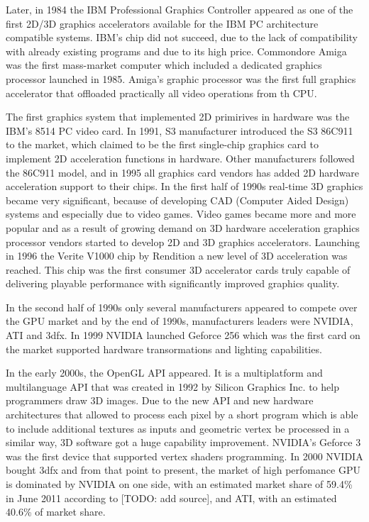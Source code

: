\documentclass[thesis=M,english]{FITthesis}[2011/07/15]
\begin{document}
Later, in 1984 the IBM Professional Graphics Controller appeared as one of the first 2D/3D graphics accelerators available for the IBM PC architecture compatible systems. IBM’s chip did not succeed, due to the lack of compatibility with already existing programs and due to its high price. Commondore Amiga was the first mass-market computer which included a dedicated graphics processor launched in 1985. Amiga's graphic processor was the first full graphics accelerator that offloaded practically all video operations from th CPU.

The first graphics system that implemented 2D primirives in hardware was the IBM's 8514 PC video card. In 1991, S3 manufacturer introduced the S3 86C911 to the market, which claimed to be the first single-chip graphics card to implement 2D acceleration functions in hardware. Other manufacturers followed the 86C911 model, and in 1995 all graphics card vendors has added 2D hardware acceleration support to their chips. In the first half of 1990s real-time 3D graphics became very significant, because of developing CAD (Computer Aided Design) systems and especially due to video games. Video games became more and more popular and as a result of growing demand on 3D hardware acceleration graphics processor vendors started to develop 2D and 3D graphics accelerators. Launching in 1996 the Verite V1000 chip by Rendition a new level of 3D acceleration was reached. This chip was the first consumer 3D accelerator cards truly capable of delivering playable performance with significantly improved graphics quality.

In the second half of 1990s only several manufacturers appeared to compete over the GPU market and by the end of 1990s, manufacturers leaders were NVIDIA, ATI and 3dfx. In 1999 NVIDIA launched Geforce 256 which was the first card on the market supported hardware transormations and lighting capabilities. 

In the early 2000s, the OpenGL API appeared. It is a multiplatform and multilanguage API that was created in 1992 by Silicon Graphics Inc. to help programmers draw 3D images. Due to the new API and new hardware architectures that allowed to process each pixel by a short program which is able to include additional textures as inputs and geometric vertex be processed in a similar way, 3D software got a huge capability improvement. NVIDIA's Geforce 3 was the first device that supported vertex shaders programming. In 2000 NVIDIA bought 3dfx and from that point to present, the market of high perfomance GPU is dominated by NVIDIA on one side, with an estimated market share of 59.4\% in June 2011 according to [TODO: add source], and ATI, with an estimated 40.6\% of market share.
\end{document}
